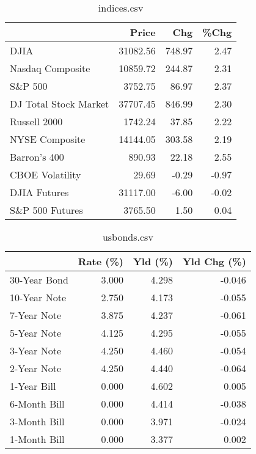 \documentclass{article}%
\begin{document}
\begin{table}[htbp]%
\caption{indices.csv}%
\centering%
\begin{adjustbox}{width=1\textwidth}%
\begin{tabular}{lrrr}
\toprule
                      &    Price &    Chg &  \%Chg \\
\midrule
                 DJIA & 31082.56 & 748.97 &  2.47 \\
     Nasdaq Composite & 10859.72 & 244.87 &  2.31 \\
              S\&P 500 &  3752.75 &  86.97 &  2.37 \\
DJ Total Stock Market & 37707.45 & 846.99 &  2.30 \\
         Russell 2000 &  1742.24 &  37.85 &  2.22 \\
       NYSE Composite & 14144.05 & 303.58 &  2.19 \\
         Barron's 400 &   890.93 &  22.18 &  2.55 \\
      CBOE Volatility &    29.69 &  -0.29 & -0.97 \\
         DJIA Futures & 31117.00 &  -6.00 & -0.02 \\
      S\&P 500 Futures &  3765.50 &   1.50 &  0.04 \\
\bottomrule
\end{tabular}
%
\end{adjustbox}%
\end{table}

%


\begin{table}[htbp]%
\caption{usbonds.csv}%
\centering%
\begin{adjustbox}{width=1\textwidth}%
\begin{tabular}{lrrr}
\toprule
             &  Rate (\%) &  Yld (\%) &  Yld Chg (\%) \\
\midrule
30-Year Bond &     3.000 &    4.298 &       -0.046 \\
10-Year Note &     2.750 &    4.173 &       -0.055 \\
 7-Year Note &     3.875 &    4.237 &       -0.061 \\
 5-Year Note &     4.125 &    4.295 &       -0.055 \\
 3-Year Note &     4.250 &    4.460 &       -0.054 \\
 2-Year Note &     4.250 &    4.440 &       -0.064 \\
 1-Year Bill &     0.000 &    4.602 &        0.005 \\
6-Month Bill &     0.000 &    4.414 &       -0.038 \\
3-Month Bill &     0.000 &    3.971 &       -0.024 \\
1-Month Bill &     0.000 &    3.377 &        0.002 \\
\bottomrule
\end{tabular}
%
\end{adjustbox}%
\end{table}
\end{document}
